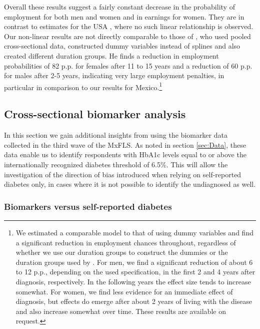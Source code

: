 \documentclass[12pt,english]{article}
\begin{document}
{Overall these results suggest a fairly constant decrease in the probability of employment for both men and women and in earnings for women. They are in contrast to estimates for the \ac{USA} \parencite{Minor2013}, where no such linear relationship is observed. Our non-linear results are not directly comparable to those of \textcite{Minor2013}, who used pooled cross-sectional data, constructed dummy variables instead of splines and also created different duration groups. He finds a reduction in employment probabilities of 82 \ac{p.p.} for females after 11 to 15 years and a reduction of 60 \ac{p.p.} for males after 2-5 years, indicating very large employment penalties, in particular in comparison to our results for Mexico.\footnote{We estimated a comparable model to that of \textcite{Minor2013} using dummy variables and find a significant reduction in employment chances throughout, regardless of whether we use our duration groups to construct the dummies or the duration groups used by \textcite{Minor2013}. For men, we find a significant reduction of about 6 to 12 \ac{p.p.}, depending on the used specification, in the first 2 and 4 years after diagnosis, respectively. In the following years the effect size tends to increase somewhat. For women, we find less evidence for an immediate effect of diagnosis, but effects do emerge after about 2 years of living with the disease and also increase somewhat over time. These results are available on request.}
\FloatBarrier

\subsection{Cross-sectional biomarker analysis}


In this section we gain additional insights from using the biomarker data collected in the
third wave of the \ac{MxFLS}. As noted in section \ref{sec:Data}, these data enable us to identify respondents with
\ac{HbA1c} levels equal to or above the internationally recognized diabetes threshold of 6.5\%. This will allow the investigation of the direction of bias introduced when relying on self-reported diabetes only, in cases where it is not possible to identify the undiagnosed as well.

\subsubsection{Biomarkers versus self-reported diabetes}


}
\end{document}
